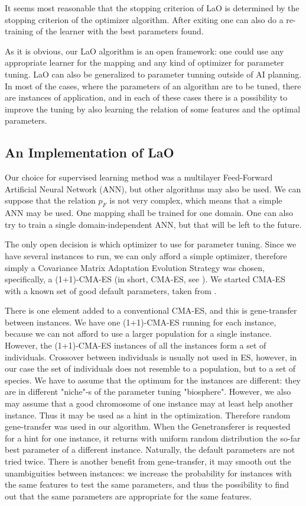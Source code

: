 \documentclass{MYsig-alternate}
\begin{document}
It seems most reasonable that the stopping criterion of LaO is determined by the stopping criterion of the optimizer algorithm. After exiting one can also do a re-training of the learner with the best parameters found.

As it is obvious, our LaO algorithm is an open framework: one could use any appropriate learner for the mapping and any kind of optimizer for parameter tuning. LaO can also be generalized to parameter tunning outside of AI planning. In most of the cases, where the parameters of an algorithm are to be tuned, there are instances of application, and in each of these cases there is a possibility to improve the tuning by also learning the relation of some features and the optimal parameters.

\subsection{An Implementation of LaO}

Our choice for supervised learning method was a multilayer Feed-Forward Artificial Neural Network (ANN), but other algorithms may also be used. We can suppose that the relation \begin{math}p_F\end{math} is not very complex, which means that a simple ANN may be used. One mapping shall be trained for one domain. One can also try to train a single domain-independent ANN, but that will be left to the future.

The only open decision is which optimizer to use for parameter tuning. Since we have several instances to run, we can only afford a simple optimizer, therefore simply a Covariance Matrix Adaptation Evolution Strategy was chosen, specifically, a (1+1)-CMA-ES (in short, CMA-ES, see \cite{hansen2001ecj}). We started CMA-ES with a known set of good default parameters, taken from \cite{BibGECCO:2010}.

There is one element added to a conventional CMA-ES, and this is gene-transfer between instances. We have one (1+1)-CMA-ES running for each instance, because we can not afford to use a larger population for a single instance. However, the (1+1)-CMA-ES instances of all the instances form a set of individuals. Crossover between individuals is usually not used in ES, however, in our case the set of individuals does not resemble to a population, but to a set of species. We have to assume that the optimum for the instances are different: they are in different "niche"-s of the parameter tuning "biosphere". However, we also may assume that a good chromosome of one instance may at least help another instance. Thus it may be used as a hint in the optimization. Therefore random gene-transfer was used in our algorithm. When the Genetransferer is requested for a hint for one instance, it returns with uniform random distribution the so-far best parameter of a different instance. Naturally, the default parameters are not tried twice. There is another benefit from gene-transfer, it may smooth out the unambiguities between instances: we increase the probability for instances with the same features to test the same parameters, and thus the possibility to find out that the same parameters are appropriate for the same features.
\end{document}
